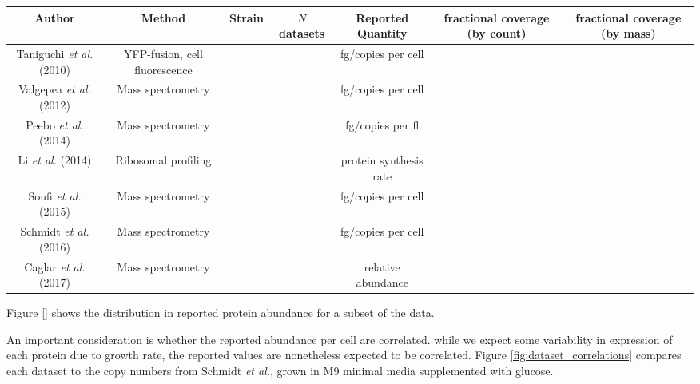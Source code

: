 \begin{tabularx}{.8\textwidth}{ || c | c | c | c | c | c | c || }
\hline
Author & Method & Strain & $N$ datasets & Reported Quantity & fractional coverage (by count) & fractional coverage (by mass) \\
\hline\hline
Taniguchi \textit{et al.} (2010) & YFP-fusion, cell fluorescence  & & & fg/copies per cell & & \\
\hline
Valgepea \textit{et al.} (2012) & Mass spectrometry  & & & fg/copies per cell & & \\
\hline
Peebo \textit{et al.} (2014) & Mass spectrometry  & & & fg/copies per fl & & \\
\hline
Li \textit{et al.} (2014) & Ribosomal profiling  & & & protein synthesis rate & & \\
\hline
Soufi \textit{et al.} (2015) & Mass spectrometry  & & & fg/copies per cell & &\\
\hline
Schmidt \textit{et al.} (2016) & Mass spectrometry  & & & fg/copies per cell & & \\
\hline
Caglar \textit{et al.} (2017) & Mass spectrometry  & & & relative abundance & &\\
\hline
\end{tabularx}

Figure \ref{} shows the distribution in reported protein abundance for   a  subset
of  the data.

An important consideration is whether the reported abundance per cell are correlated. while
we expect some variability in expression of each protein due to growth rate, the reported
values are nonetheless expected to be correlated. Figure \ref{fig:dataset_correlations} compares each dataset to the copy numbers from Schmidt \textit{et al.}, grown in M9 minimal media supplemented with glucose.
%
%
%
